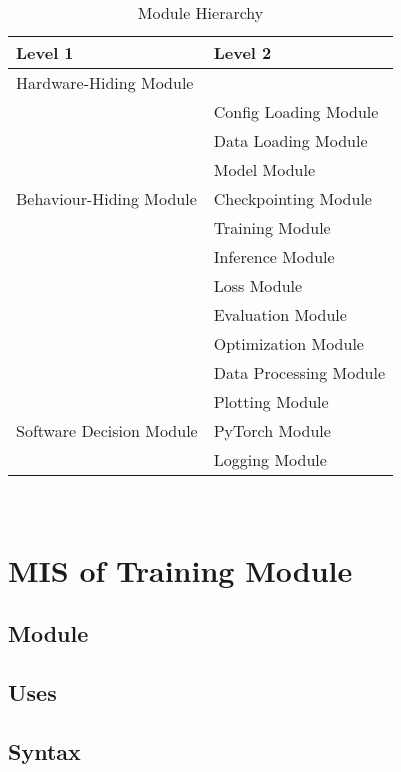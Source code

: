 \documentclass[12pt, titlepage]{article}
\begin{document}
\begin{table}[h!]
  \centering
  \begin{tabular}{p{} p{}}
  \toprule
  \textbf{Level 1} & \textbf{Level 2}\\
  \midrule
  
  {Hardware-Hiding Module} & ~ \\
  \midrule
  
  \multirow{7}{0.3\textwidth}{Behaviour-Hiding Module} 
  & Config Loading Module\\
  & Data Loading Module\\
  & Model Module\\
  & Checkpointing Module\\
  & Training Module\\
  & Inference Module\\
  & Loss Module\\ 
  & Evaluation Module\\
  & Optimization Module\\
  & Data Processing Module\\
  \midrule
  
  \multirow{3}{0.3\textwidth}{Software Decision Module}
  & Plotting Module\\
  & PyTorch Module\\
  & Logging Module\\
  \bottomrule
  
  \end{tabular}
  \caption{Module Hierarchy}
  \label{TblMH}
  \end{table}

\newpage
~\newpage

\section{MIS of Training Module} \label{Module} 

\subsection{Module}



\subsection{Uses}


\subsection{Syntax}
\end{document}

